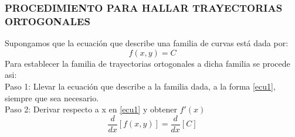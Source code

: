 \documentclass[12pt,letterpaper]{article}
\begin{document}
\begin{titlepage}
\subsubsection{PROCEDIMIENTO PARA HALLAR TRAYECTORIAS ORTOGONALES}
\begin{flushleft}
Supongamos que la ecuación que describe una familia de curvas está dada por:
\begin{equation} \tag{1} \label{ecu1}
f(x,y) = C
\end{equation}
Para establecer la familia de trayectorias ortogonales a dicha familia se procede asi:\\
\vspace{0.6cm}
Paso 1: Llevar la ecuación que describe a la familia dada, a la forma \eqref{ecu1}, siempre que sea necesario.\\
\vspace{0.6cm}
Paso 2: Derivar respecto a x en \eqref{ecu1} y obtener $f'(x)$
\begin{equation*}
\dfrac{d}{dx} [f(x,y)] = \dfrac{d}{dx}[C]
\end{equation*}
\end{flushleft}
\end{titlepage}
\end{document}
